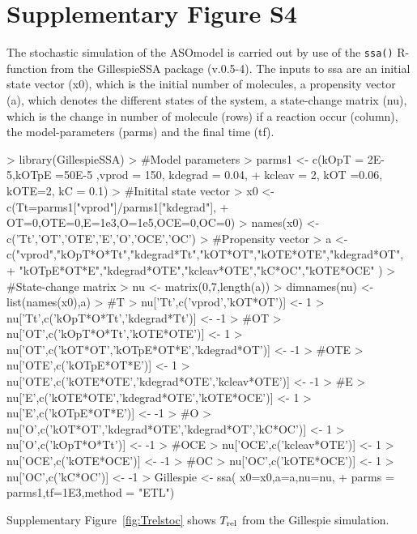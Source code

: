 \documentclass[a4paper,11pt]{article}
\newcommand{\Trel}{T_{\rm{rel}}}
\begin{document}
\section{Supplementary Figure S4}
The stochastic simulation of the ASOmodel is carried out by use of the \texttt{ssa()} R-function from the GillespieSSA package (v.0.5-4). The inputs to ssa are an initial state vector (x0), which is the initial number of molecules, a propensity vector (a), which denotes the different states of the system, a state-change matrix (nu), which is the change in number of molecule (rows) if a reaction occur (column), the model-parameters (parms) and the final time (tf).
\begin{Schunk}
\begin{Sinput}
> library(GillespieSSA)
> #Model parameters
> parms1 <- c(kOpT = 2E-5,kOTpE =50E-5 ,vprod = 150,  kdegrad = 0.04,		  
+               kcleav = 2, kOT =0.06, kOTE=2, kC = 0.1)
> #Initital state vector
> x0 <- c(Tt=parms1["vprod"]/parms1["kdegrad"],
+         OT=0,OTE=0,E=1e3,O=1e5,OCE=0,OC=0)
> names(x0) <- c('Tt','OT','OTE','E','O','OCE','OC')
> #Propensity vector
> a <-  c("vprod","kOpT*O*Tt","kdegrad*Tt","kOT*OT","kOTE*OTE","kdegrad*OT",
+         "kOTpE*OT*E","kdegrad*OTE","kcleav*OTE","kC*OC","kOTE*OCE" )
> #State-change matrix
> nu <- matrix(0,7,length(a))
> dimnames(nu) <- list(names(x0),a)
> #T
> nu['Tt',c('vprod','kOT*OT')] <- 1
> nu['Tt',c('kOpT*O*Tt','kdegrad*Tt')] <- -1 
> #OT
> nu['OT',c('kOpT*O*Tt','kOTE*OTE')] <- 1
> nu['OT',c('kOT*OT','kOTpE*OT*E','kdegrad*OT')] <- -1
> #OTE
> nu['OTE',c('kOTpE*OT*E')] <- 1
> nu['OTE',c('kOTE*OTE','kdegrad*OTE','kcleav*OTE')] <- -1
> #E
> nu['E',c('kOTE*OTE','kdegrad*OTE','kOTE*OCE')] <- 1
> nu['E',c('kOTpE*OT*E')] <- -1
> #O
> nu['O',c('kOT*OT','kdegrad*OTE','kdegrad*OT','kC*OC')] <- 1
> nu['O',c('kOpT*O*Tt')] <- -1
> #OCE
> nu['OCE',c('kcleav*OTE')] <- 1
> nu['OCE',c('kOTE*OCE')] <- -1
> #OC
> nu['OC',c('kOTE*OCE')] <- 1
> nu['OC',c('kC*OC')] <- -1
> Gillespie <- ssa( x0=x0,a=a,nu=nu,
+       parms = parms1,tf=1E3,method = "ETL")
\end{Sinput}
\end{Schunk}
Supplementary Figure~\ref{fig:Trelstoc} shows $\Trel$ from the Gillespie simulation.
\end{document}
